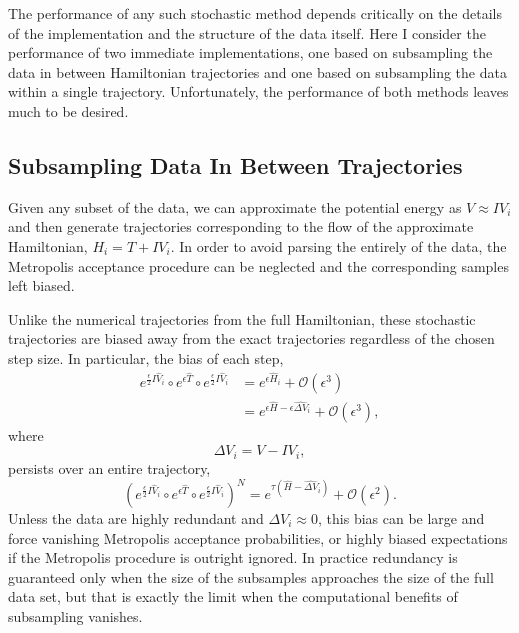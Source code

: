\documentclass{article}
\begin{document}
The performance of any such stochastic method depends critically on the details
of the implementation and the structure of the data itself.  Here I consider
the performance of two immediate implementations, one based on subsampling the
data in between Hamiltonian trajectories and one based on subsampling the data
within a single trajectory.  Unfortunately, the performance of both methods leaves
much to be desired.

\subsection{Subsampling Data In Between Trajectories}

Given any subset of the data, we can approximate the potential energy as 
$V \approx I V_{i}$ and then generate trajectories corresponding to the flow of the 
approximate Hamiltonian, $H_{i} = T + I V_{i}$.  In order to avoid parsing the entirely
of the data, the Metropolis acceptance procedure can be neglected and the 
corresponding samples left biased.

Unlike the numerical trajectories from the full Hamiltonian, these stochastic 
trajectories are biased away from the exact trajectories regardless of the
chosen step size.  In particular, the bias of each step,
%
\begin{align*}
e^{\frac{\epsilon}{2} I \hat{V}_{i} } \circ 
e^{\epsilon \hat{T} } \circ 
e^{\frac{\epsilon}{2} I \hat{V}_{i} }
&=
e^{ \epsilon \hat{H}_{i} }
+ \mathcal{O} \! \left( \epsilon^{3} \right)
\\
&=
e^{ \epsilon \hat{H} - \epsilon \widehat{ \Delta V}_{i} }
+ \mathcal{O} \! \left( \epsilon^{3} \right),
\end{align*}
%
where
%
\begin{equation*}
\Delta V_{i} = V - I V_{i},
\end{equation*}
%
persists over an entire trajectory,
%
\begin{equation*}
\left( e^{\frac{\epsilon}{2} I \hat{V}_{i} } \circ 
e^{\epsilon \hat{T} } \circ 
e^{\frac{\epsilon}{2} I \hat{V}_{i} } \right)^{N}
=
e^{ \tau \left( \hat{H} - \widehat{ \Delta V}_{i} \right) }
+ \mathcal{O} \! \left( \epsilon^{2} \right).
\end{equation*}
%
Unless the data are highly redundant and $\Delta V_{i} \approx 0$,
this bias can be large and force vanishing Metropolis acceptance probabilities,
or highly biased expectations if the Metropolis procedure is outright ignored.  
In practice redundancy is guaranteed only when the size of the subsamples
approaches the size of the full data set, but that is exactly the limit when the
computational benefits of subsampling vanishes.
\end{document}
